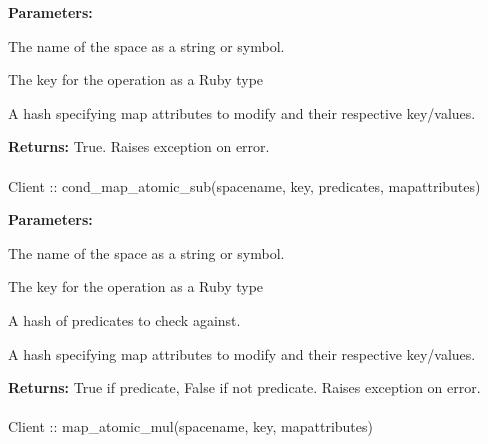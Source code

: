 \noindent\textbf{Parameters:}
\begin{description}[labelindent=\widthof{{\code{mapattributes}}},leftmargin=*,noitemsep,nolistsep,align=right]
\item[\code{spacename}] The name of the space as a string or symbol.
\item[\code{key}] The key for the operation as a Ruby type
\item[\code{mapattributes}] A hash specifying map attributes to modify and their respective key/values.
\end{description}

\noindent\textbf{Returns:}
True.  Raises exception on error.

\paragraph{}
\begin{ccode}
Client :: cond_map_atomic_sub(spacename, key, predicates, mapattributes)
\end{ccode}
\funcdesc 

\noindent\textbf{Parameters:}
\begin{description}[labelindent=\widthof{{\code{mapattributes}}},leftmargin=*,noitemsep,nolistsep,align=right]
\item[\code{spacename}] The name of the space as a string or symbol.
\item[\code{key}] The key for the operation as a Ruby type
\item[\code{predicates}] A hash of predicates to check against.
\item[\code{mapattributes}] A hash specifying map attributes to modify and their respective key/values.
\end{description}

\noindent\textbf{Returns:}
True if predicate, False if not predicate.  Raises exception on error.

\paragraph{}
\begin{ccode}
Client :: map_atomic_mul(spacename, key, mapattributes)
\end{ccode}
\funcdesc 

